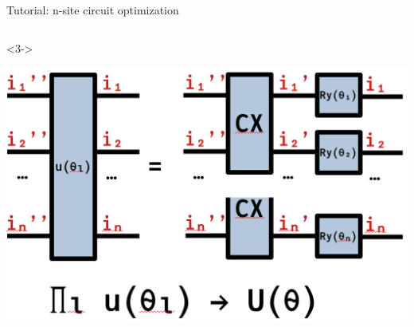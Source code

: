 \begin{frame}[fragile]{Tutorial: n-site circuit optimization}
\begin{columns}
\begin{column}{5.5cm}
\begin{onlyenv}<3->
\vspace*{0.0cm}
\begin{center}
\includegraphics[width=\textwidth]{
  slides/assets/Un.png
}
\end{center}
\vspace*{0.0cm}
\end{onlyenv}

\end{column}

\end{columns}

\end{frame}

